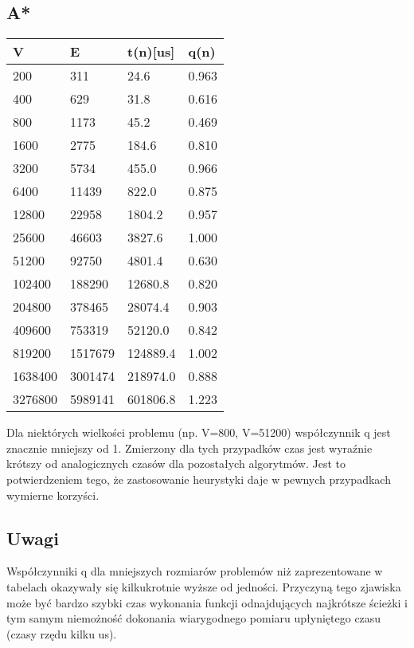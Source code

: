 \documentclass[11pt,a4paper]{article}
\begin{document}
\subsection{A*}
\begin{longtable}{| m{1.7cm}| m{1.7cm} | m{1.7cm} | m{1.2cm} |}
\hline
V    &      E    &      t(n)[us] &  q(n)  \\ \hline
200  &      311  &      24.6  &     0.963 \\ \hline
400  &      629  &      31.8  &     0.616 \\ \hline
800  &      1173  &     45.2  &     0.469 \\ \hline
1600  &     2775  &     184.6  &    0.810 \\ \hline
3200  &     5734  &     455.0  &    0.966 \\ \hline
6400  &     11439  &    822.0  &    0.875 \\ \hline
12800  &    22958  &    1804.2  &   0.957 \\ \hline
25600  &    46603  &    3827.6  &   1.000 \\ \hline
51200  &    92750  &    4801.4  &   0.630 \\ \hline
102400  &   188290  &   12680.8  &  0.820 \\ \hline
204800  &   378465  &   28074.4  &  0.903 \\ \hline
409600  &   753319  &   52120.0  &  0.842 \\ \hline
819200  &   1517679  &  124889.4  & 1.002 \\ \hline
1638400  &  3001474  &  218974.0  & 0.888 \\ \hline
3276800  &  5989141  &  601806.8  & 1.223 \\ \hline
\end{longtable}

Dla niektórych wielkości problemu (np. V=800, V=51200) współczynnik q jest znacznie mniejszy od 1.
Zmierzony dla tych przypadków czas jest wyraźnie krótszy od analogicznych czasów dla pozostałych algorytmów.
Jest to potwierdzeniem tego, że zastosowanie heurystyki daje w pewnych przypadkach wymierne korzyści.

\subsection{Uwagi}
Współczynniki q dla mniejszych rozmiarów problemów niż zaprezentowane w tabelach okazywały się kilkukrotnie
wyższe od jedności. Przyczyną tego zjawiska może być bardzo szybki czas wykonania funkcji odnajdujących najkrótsze
ścieżki i tym samym niemożność dokonania wiarygodnego pomiaru upłyniętego czasu (czasy rzędu kilku us).
\end{document}
